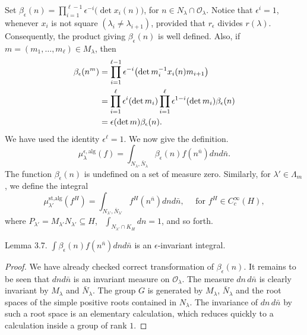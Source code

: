 \documentclass{amsart}
\begin{document}
\noindent
Set
  $ \beta_{\epsilon} (n) =  
    \prod_{i=1}^{\ell-1} \epsilon^{-i} 
    \bigl(
       \det x_i (n)
    \bigr) $, for $n\in N_\lambda\cap{\mathcal O}_\lambda$.
Notice that $ \epsilon^i = 1 $,
whenever
  $ x_i $
is not square
  $ (\lambda_i \neq \lambda_{i+1} ) $, provided that
  $r_\epsilon$ divides $r(\lambda)$.
Consequently, the product giving
  $ \beta_{\epsilon} (n) $
is well defined.
Also, if
  $ m =
     (m_1, \dots, m_{\ell}) \in M_{\lambda} $,
then
%
\begin{align*}
\beta_{\epsilon} (n^m) &=
    \prod_{i=1}^{\ell-1} 
    \epsilon^{-i}
    \bigl(
      \det 
         m_i^{-1} 
            x_i (n)
            m_{i+1}
     \bigr)
\\
\vspace{4pt}
&=
    \prod_{i=1}^{\ell} 
    \epsilon^i
    (\det m_i)
    \prod_{i=1}^{\ell} 
    \epsilon^{1-i} 
    (\det m_i) 
    \beta_{\epsilon} (n)
\\
\vspace{4pt}
&=
   \epsilon
   (\det m)
   \beta_{\epsilon} (n).
\end{align*}
%
   We have used the identity $\epsilon^{\ell} = 1 $.
\noindent
We now give the definition.
%
$$
  \mu_{\lambda}^{\epsilon,\text{alg}}
  (f) =
  \int_{N_{\lambda},\bar N_{\lambda}}
  \beta_{\epsilon} (n) 
  f (n^{\bar n}) d nd \bar n.
$$
%
The function $\beta_{\epsilon} (n) $ is undefined on 
a set of measure zero.
Similarly, for $ \lambda' \in \Lambda_m $,
we define the integral
%
$$
  \mu_{\lambda'}^{\text{st}, \text{alg}}
  (f^H) =
  \int_{ N_{\lambda'}, \bar N_{\lambda'} }
  f^H(n^{\bar n}) d n d \bar n, \quad \text{ for }f^H\in C_c^\infty(H),
$$
%
where
  $ P_{\lambda'} = 
    M_{\lambda'} 
    N_{\lambda'} 
    \subseteq
    H$, \ 
    $\int_{N_{\lambda'}\cap K_H}
    d n = 1 $, and so forth.

\proclaim Lemma {3.7}.
  $ \int
    \beta_{\epsilon} (n) f 
    (n^{\bar n}) 
    d n d \bar n $
is an 
  $ \epsilon$-invariant integral.
\finishproclaim

\begin{proof}
We have already checked correct transformation of
  $ \beta_{\epsilon} (n) $.
It remains to be seen that
  $ d n d \bar n$
is an invariant measure on
  $ {\mathcal O}_{\lambda} $.
The measure $dn\,d\bar n$ is clearly invariant
by $M_\lambda$ and $\bar N_\lambda$.  The group
$G$ is generated by $M_\lambda$, $\bar N_\lambda$ and
the root spaces of the simple positive roots contained
in $N_\lambda$.  The invariance of $dn\,d\bar n$
by such a root space is an elementary calculation,
which reduces quickly to a calculation inside a group of rank $1$.
\end{proof}
\end{document}
